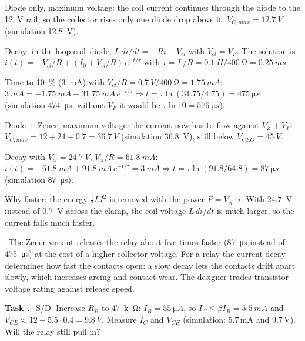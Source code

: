 \documentclass[a4paper,11pt]{article}
\newcounter{task}[section]
\renewcommand{\thetask}{\thesection.\arabic{task}}
\newcommand{\task}[1]{\par\medskip\refstepcounter{task}%
  {\sffamily\bfseries\color{rwuviolet}Task \thetask}\ {\sffamily\small\color{rwucyandark}[#1]}\quad}
\newenvironment{solution}{\begin{solbox}}{\end{solbox}}
\newcommand{\answer}{\par\smallskip{\sffamily\bfseries\color{rwuviolet}Answer:}\ }
\newcommand{\simv}[1]{\textcolor{rwuviolet}{#1}}
\newcommand{\simv}[1]{}
\begin{document}
\begin{solution}
\begin{steps}
  \item Diode only, maximum voltage: the coil current continues through the diode to the \SI{12}{V} rail, so the
        collector rises only one diode drop above it: $V_{C,max}=\SI{12.7}{V}$ (simulation \SI{12.8}{V}).
  \item Decay: in the loop coil--diode, $L\,di/dt=-Ri-V_{cl}$ with $V_{cl}=V_F$. The solution is
        $i(t)=-V_{cl}/R+(I_0+V_{cl}/R)\,e^{-t/\tau}$ with $\tau=L/R=\SI{0.1}{H}/\SI{400}{\ohm}=\SI{0.25}{ms}$.
  \item Time to \SI{10}{\percent} (\SI{3}{mA}) with $V_{cl}/R=\SI{0.7}{V}/\SI{400}{\ohm}=\SI{1.75}{mA}$:
        $\SI{3}{mA}=-\SI{1.75}{mA}+\SI{31.75}{mA}\,e^{-t/\tau}\Rightarrow t=\tau\ln(31.75/4.75)=\SI{475}{\micro s}$
        (simulation \SI{474}{\micro s}; without $V_F$ it would be $\tau\ln10=\SI{576}{\micro s}$).
  \item Diode + Zener, maximum voltage: the current now has to flow against $V_Z+V_F$:
        $V_{C,max}=12+24+0.7=\SI{36.7}{V}$ (simulation \SI{36.8}{V}), still below $V_{CEO}=\SI{45}{V}$.
  \item Decay with $V_{cl}=\SI{24.7}{V}$, $V_{cl}/R=\SI{61.8}{mA}$:
        $i(t)=-\SI{61.8}{mA}+\SI{91.8}{mA}\,e^{-t/\tau}=\SI{3}{mA}\Rightarrow t=\tau\ln(91.8/64.8)=\SI{87}{\micro s}$
        (simulation \SI{87}{\micro s}).
  \item Why faster: the energy $\tfrac12LI^2$ is removed with the power $P=V_{cl}\cdot i$. With \SI{24.7}{V}
        instead of \SI{0.7}{V} across the clamp, the coil voltage $L\,di/dt$ is much larger, so the current falls
        much faster.
\end{steps}
\answer The Zener variant releases the relay about five times faster (\SI{87}{\micro s} instead of
\SI{475}{\micro s}) at the cost of a higher collector voltage. For a relay the current decay determines how fast
the contacts open: a slow decay lets the contacts drift apart slowly, which increases arcing and contact wear. The
designer trades transistor voltage rating against release speed.
\end{solution}

\task{S/D} Increase $R_B$ to \SI{47}{k\ohm}: $I_B=\SI{55}{\micro A}$, so $I_C\le\beta I_B=\SI{5.5}{mA}$ and
$V_{CE}\approx 12-5.5\cdot0.4=\SI{9.8}{V}$. Measure $I_C$ and $V_{CE}$
(simulation: \underline{\hspace{1.5cm}}\simv{5.7\,mA} and \underline{\hspace{1.5cm}}\simv{9.7\,V}). Will the relay still pull in?
\end{document}
